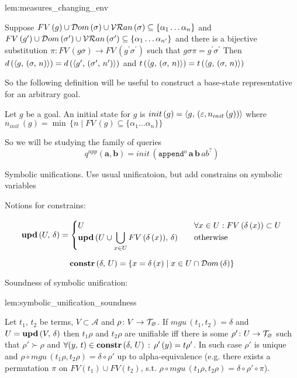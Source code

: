 \begin{replemma}{lem:measures_changing_env}

  Suppose $FV\,(g) \cup \mathcal{D}om\,(\sigma) \cup \mathcal{VR}an\,(\sigma) \subseteq \{ \alpha_1\dots\alpha_n \} $ and $FV\,(g^\prime) \cup \mathcal{D}om\,(\sigma^\prime) \cup \mathcal{VR}an\,(\sigma^\prime) \subseteq \{ \alpha_1\dots \alpha_{n^\prime} \} $
  and there is a bijective substitution $\pi \colon FV\,(g \sigma) \to FV\,(g^\prime \sigma^\prime)$  such that  $g \sigma \pi = g^\prime \sigma^\prime $ Then $ d\,(\langle g ,\, (\sigma ,\, n) \rangle) = d\,(\langle g^\prime ,\, (\sigma^\prime ,\, n^\prime) \rangle) $ and $ t\,(\langle g ,\, (\sigma ,\, n) \rangle) = t\,(\langle g ,\, (\sigma ,\, n) \rangle) $

\end{replemma}

So the following definition will be useful to construct a base-state representative for an arbitrary goal.

\begin{definition} Let $g$ be a goal. An initial state for $g$ is $init\,(g)=\langle g ,\, (\varepsilon, n_{init}\,(g)) \rangle $ where $ n_{init}\,(g) = \min\, \{ n \mid FV\,(g) \subseteq \{ \alpha_1\dots\alpha_n \} \} $
\end{definition}

So we will be studying the family of queries \[ q^{app}(\mathbf{a}, \mathbf{b}) = init\,(\texttt{append$^o$} \, \mathbf{a} \, \mathbf{b} \, ab^?) \]

\colorbox{blue!20}{\parbox{\textwidth}{Symbolic unifications. Use usual unificatoion, but add constrains on symbolic variables}}

Notions for constrains:

\[
\mbox{\textbf{upd}}\,(U,\, \delta) = \begin{cases}
                           U & \quad\forall x \in U : FV\,(\delta\,(x)) \subset U \\
                           \mbox{\textbf{upd}}\,(U \cup \displaystyle\bigcup\limits_{x \in U} FV\,(\delta\,(x)),\, \delta) & \quad\mbox{otherwise}
                          \end{cases}
\]

\[ \mbox{\textbf{constr}}\,(\delta,\, U) = \{ x = \delta\,(x) \mid x \in U \cap \mathcal{D}om\,(\delta) \} \]

Soundness of symbolic unification:

\begin{replemma}{lem:symbolic_unification_soundness}

  Let $t_1$, $t_2$ be terms,  $V \subset \mathcal{A}$ and $\rho \colon V \to \mathcal{T}_{\varnothing}$. If $mgu\,(t_1, t_2) = \delta$ and $U = \mbox{\textbf{upd}}\,(V,\, \delta) $  then $t_1 \rho$ and $t_2 \rho$ are unifiable iff there is some $\rho' \colon U \to \mathcal{T}_{\varnothing}$ such that $\rho' \succ \rho$ and $\forall (y, \, t) \in \mbox{\textbf{constr}}\,(\delta,\, U)\,:\, \rho'\,(y) = t \rho'$.
In such case $\rho'$ is unique and $ \rho \circ mgu\,(t_1 \rho, t_2 \rho) = \delta\circ\rho' $ up to alpha-equivalence (e.g. there exists a permutation $\pi$ on $FV(t_1) \cup FV(t_2)$, s.t. $ \rho \circ mgu\,(t_1 \rho, t_2 \rho) = \delta \circ\rho'\circ \pi$).
\end{replemma}


